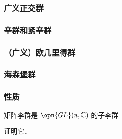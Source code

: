 \subsubsection{广义正交群}



\subsubsection{辛群和紧辛群}

\subsubsection{（广义）欧几里得群}

\subsubsection{海森堡群}

\subsubsection{性质}

\begin{theorem}{}
矩阵李群是 $\opn{GL}(n, \mathbb{C})$ 的子李群
\end{theorem}

\begin{exercise}{}
证明它．
\end{exercise}